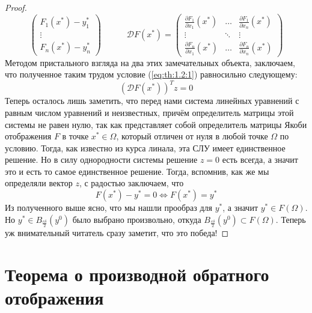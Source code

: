 \documentclass[11pt]{article}
\begin{document}
\begin{proof}
\begin{equation*}
\begin{pmatrix}
            F_1 \left(x^{\ast} \right) - y_1^{\ast} \\
            \vdots \\
            F_n \left(x^{\ast} \right) - y_n^{\ast}
        \end{pmatrix}
        \quad \quad \quad 
        \mathcal{D} F \left(x^{\ast} \right) = 
        \begin{pmatrix}
            \displaystyle \frac{\partial F_1}{\partial x_1} \left(x^{\ast} \right) & \ldots & \displaystyle \frac{\partial F_1}{\partial x_n} \left(x^{\ast} \right) \\
            \displaystyle \vdots & \ddots & \vdots \\
            \displaystyle \frac{\partial F_n}{\partial x_1} \left(x^{\ast} \right) & \ldots & \displaystyle \frac{\partial F_n}{\partial x_n} \left(x^{\ast} \right)
        \end{pmatrix}
    \end{equation*}
    Методом пристального взгляда на два этих замечательных объекта, заключаем, что полученное таким трудом условие (\ref{eq:th:1.2:1}) равносильно следующему:
    \[\left(\mathcal{D} F \left(x^{\ast}\right) \right)^{T} z = 0\]
    Теперь осталось лишь заметить, что перед нами система линейных уравнений с равным числом уравнений и неизвестных, причём определитель матрицы этой системы не равен нулю, так как представляет собой 
    определитель матрицы Якоби отображения $F$ в точке $x^{\ast} \in \Omega$, который отличен от нуля в любой точке $\Omega$ по условию. Тогда, как известно из 
    курса линала, эта СЛУ имеет единственное решение. Но в силу однородности системы решение $z = 0$ есть всегда, а значит это и есть то самое единственное решение. Тогда, вспомнив, как же мы определяли вектор $z$, с радостью 
    заключаем, что 
    \[F \left(x^{\ast} \right) - y^{\ast} = 0 \iff F \left(x^{\ast} \right) = y^{\ast}\]
    Из полученного выше ясно, что мы нашли прообраз для $y^{\ast}$, а значит $y^{\ast} \in F(\Omega)$. Но $y^{\ast} \in B_{\frac{c \delta}{2}} \left(y^0\right)$ было выбрано произвольно, откуда $B_{\frac{c \delta}{2}} \left(y^0\right) \subset F(\Omega)$. Теперь уж внимательный читатель сразу заметит, что это победа!
\end{proof}

\section{Теорема о производной обратного отображения}
\end{document}
